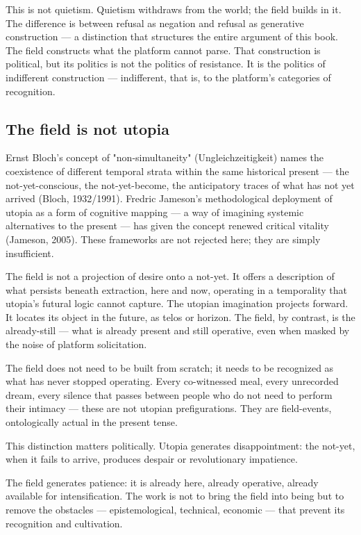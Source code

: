 This is not quietism. Quietism withdraws from the world; the field builds in it. The difference is between refusal as negation and refusal as generative construction — a distinction that structures the entire argument of this book. The field constructs what the platform cannot parse. That construction is political, but its politics is not the politics of resistance. It is the politics of indifferent construction — indifferent, that is, to the platform's categories of recognition.

\subsection{The field is not utopia}

Ernst Bloch's concept of "non-simultaneity" (Ungleichzeitigkeit) names the coexistence of different temporal strata within the same historical present — the not-yet-conscious, the not-yet-become, the anticipatory traces of what has not yet arrived (Bloch, 1932/1991). Fredric Jameson's methodological deployment of utopia as a form of cognitive mapping — a way of imagining systemic alternatives to the present — has given the concept renewed critical vitality (Jameson, 2005). These frameworks are not rejected here; they are simply insufficient.

The field is not a projection of desire onto a not-yet. It offers a description of what persists beneath extraction, here and now, operating in a temporality that utopia's futural logic cannot capture. The utopian imagination projects forward. It locates its object in the future, as telos or horizon. The field, by contrast, is the already-still — what is already present and still operative, even when masked by the noise of platform solicitation.

The field does not need to be built from scratch; it needs to be recognized as what has never stopped operating. Every co-witnessed meal, every unrecorded dream, every silence that passes between people who do not need to perform their intimacy — these are not utopian prefigurations. They are field-events, ontologically actual in the present tense.

This distinction matters politically. Utopia generates disappointment: the not-yet, when it fails to arrive, produces despair or revolutionary impatience.

The field generates patience: it is already here, already operative, already available for intensification. The work is not to bring the field into being but to remove the obstacles — epistemological, technical, economic — that prevent its recognition and cultivation.

